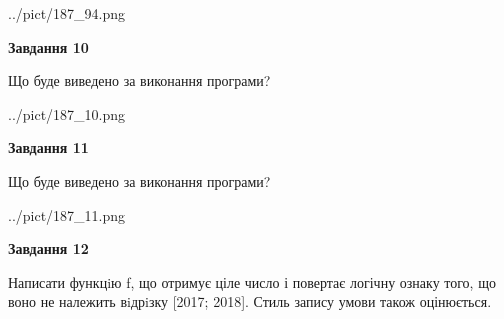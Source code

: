 \documentclass[12pt, ukrainian]{article}
\begin{document}
{\begin {large}
\begin{center}
	{../pict/187_94.png}
\end{center}
\newpage

{\begin {center}\textbf{Завдання 10}\end {center}}

Що буде виведено за виконання програми?\par
\begin{center}
	{../pict/187_10.png}
\end{center}
\newpage

{\begin {center}\textbf{Завдання 11}\end {center}}

Що буде виведено за виконання програми?\par
\begin{center}
	{../pict/187_11.png}
\end{center}
\newpage

{\begin {center}\textbf{Завдання 12}\end {center}}


Написати функцiю f, що отримує ціле число і повертає логічну ознаку того, що воно не належить вiдрiзку [2017; 2018]. Стиль запису умови також оцінюється.\par
\newpage

\end {large}}
\end{document}
